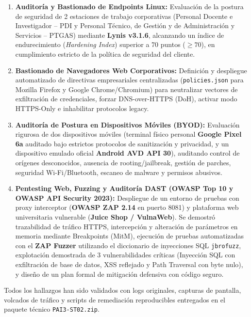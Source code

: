 \documentclass[11pt,a4paper]{article}
\begin{document}
\begin{enumerate}[noitemsep]
    \item \textbf{Auditoría y Bastionado de Endpoints Linux:} Evaluación de la postura de seguridad de 2 estaciones de trabajo corporativas (Personal Docente e Investigador -- PDI y Personal Técnico, de Gestión y de Administración y Servicios -- PTGAS) mediante \textbf{Lynis v3.1.6}, alcanzando un índice de endurecimiento (\textit{Hardening Index}) superior a 70 puntos ($\ge 70$), en cumplimiento estricto de la política de seguridad del cliente.
    \item \textbf{Bastionado de Navegadores Web Corporativos:} Definición y despliegue automatizado de directivas empresariales centralizadas (\texttt{policies.json} para Mozilla Firefox y Google Chrome/Chromium) para neutralizar vectores de exfiltración de credenciales, forzar DNS-over-HTTPS (DoH), activar modo HTTPS-Only e inhabilitar protocolos legacy.
    \item \textbf{Auditoría de Postura en Dispositivos Móviles (BYOD):} Evaluación rigurosa de dos dispositivos móviles (terminal físico personal \textbf{Google Pixel 6a} auditado bajo estrictos protocolos de sanitización y privacidad, y un dispositivo emulado oficial \textbf{Android AVD API 30}), auditando control de orígenes desconocidos, ausencia de rooting/jailbreak, gestión de parches, seguridad Wi-Fi/Bluetooth, escaneo de malware y permisos abusivos.
    \item \textbf{Pentesting Web, Fuzzing y Auditoría DAST (OWASP Top 10 y OWASP API Security 2023):} Despliegue de un entorno de pruebas con proxy interceptor (\textbf{OWASP ZAP 2.14} en puerto 8081) y plataforma web universitaria vulnerable (\textbf{Juice Shop / VulnaWeb}). Se demostró trazabilidad de tráfico HTTPS, intercepción y alteración de parámetros en memoria mediante Breakpoints (MitM), ejecución de pruebas automatizadas con el \textbf{ZAP Fuzzer} utilizando el diccionario de inyecciones SQL \texttt{jbrofuzz}, explotación demostrada de 3 vulnerabilidades críticas (Inyección SQL con exfiltración de base de datos, XSS reflejado y Path Traversal con byte nulo), y diseño de un plan formal de mitigación defensiva con código seguro.
\end{enumerate}

Todos los hallazgos han sido validados con logs originales, capturas de pantalla, volcados de tráfico y scripts de remediación reproducibles entregados en el paquete técnico \texttt{PAI3-ST02.zip}.

\end{document}

